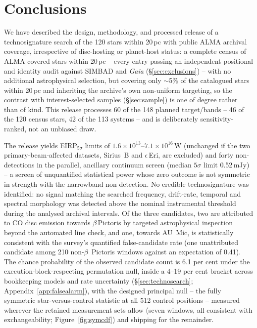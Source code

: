 \documentclass{openjournal}
\begin{document}
\section{Conclusions}
\label{sec:conclusions}

We have described the design, methodology, and processed release of a
technosignature search of the 120 stars within 20\,pc with public
ALMA archival coverage, irrespective of disc-hosting or planet-host
status: a complete census of ALMA-covered stars within 20\,pc -- every
entry passing an independent positional and identity audit against
SIMBAD and \emph{Gaia} (\S\ref{sec:exclusions}) -- with no additional
astrophysical selection, but covering only $\sim$5\% of the
catalogued stars within 20\,pc and inheriting the archive's own
non-uniform targeting, so the contrast with interest-selected samples
(\S\ref{sec:sample}) is one of degree rather than of kind. This
release processes 60 of the 148 planned target/bands -- 46 of the 120
census stars, 42 of the 113 systems -- and is deliberately
sensitivity-ranked, not an unbiased draw.

The release yields EIRP$_{5\sigma}$ limits of
$1.6\times10^{13}$--$7.1\times10^{16}$\,W (unchanged if the two
primary-beam-affected datasets, Sirius~B and $\epsilon$\,Eri, are
excluded) and forty non-detections in the parallel, ancillary
continuum screen (median $5\sigma$ limit 0.52\,mJy) -- a screen of
unquantified statistical power whose zero outcome is not symmetric in
strength with the narrowband non-detection. No credible
technosignature was identified: no signal matching the searched
frequency, drift-rate, temporal and spectral morphology was detected
above the nominal instrumental threshold during the analysed archival
intervals. Of the three candidates, two are attributed to CO disc
emission towards $\beta$\,Pictoris by targeted astrophysical
inspection beyond the automated line check, and one, towards AU~Mic,
is statistically consistent with the survey's quantified
false-candidate rate (one unattributed candidate among 210
non-$\beta$~Pictoris windows against an expectation of 0.41). The
chance probability of the observed candidate count is 6.1 per cent
under the execution-block-respecting permutation null, inside a
4--19 per cent bracket across bookkeeping models and rate uncertainty
(\S\ref{sec:technosearch}; Appendix~\ref{app:falsealarm}), with the
designed principal null -- the fully symmetric star-versus-control
statistic at all 512 control positions -- measured wherever the
retained measurement sets allow (seven windows, all consistent with
exchangeability; Figure~\ref{fig:symcdf}) and shipping for the
remainder.
\end{document}
